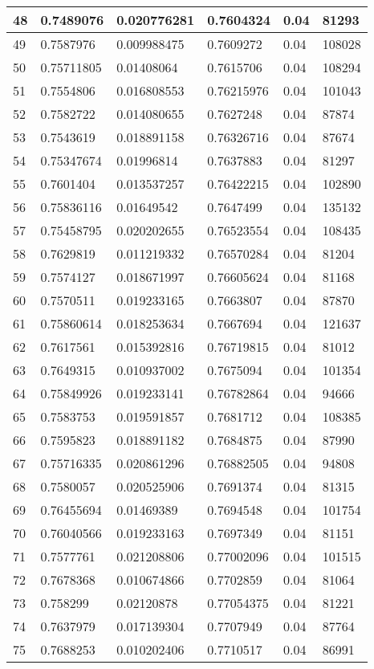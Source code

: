 \begin{longtable}{|l|l|l|l|l|l|}
48 & 0.7489076 & 0.020776281 & 0.7604324 & 0.04 & 81293 \\ \hline 
49 & 0.7587976 & 0.009988475 & 0.7609272 & 0.04 & 108028 \\ \hline 
50 & 0.75711805 & 0.01408064 & 0.7615706 & 0.04 & 108294 \\ \hline 
51 & 0.7554806 & 0.016808553 & 0.76215976 & 0.04 & 101043 \\ \hline 
52 & 0.7582722 & 0.014080655 & 0.7627248 & 0.04 & 87874 \\ \hline 
53 & 0.7543619 & 0.018891158 & 0.76326716 & 0.04 & 87674 \\ \hline 
54 & 0.75347674 & 0.01996814 & 0.7637883 & 0.04 & 81297 \\ \hline 
55 & 0.7601404 & 0.013537257 & 0.76422215 & 0.04 & 102890 \\ \hline 
56 & 0.75836116 & 0.01649542 & 0.7647499 & 0.04 & 135132 \\ \hline 
57 & 0.75458795 & 0.020202655 & 0.76523554 & 0.04 & 108435 \\ \hline 
58 & 0.7629819 & 0.011219332 & 0.76570284 & 0.04 & 81204 \\ \hline 
59 & 0.7574127 & 0.018671997 & 0.76605624 & 0.04 & 81168 \\ \hline 
60 & 0.7570511 & 0.019233165 & 0.7663807 & 0.04 & 87870 \\ \hline 
61 & 0.75860614 & 0.018253634 & 0.7667694 & 0.04 & 121637 \\ \hline 
62 & 0.7617561 & 0.015392816 & 0.76719815 & 0.04 & 81012 \\ \hline 
63 & 0.7649315 & 0.010937002 & 0.7675094 & 0.04 & 101354 \\ \hline 
64 & 0.75849926 & 0.019233141 & 0.76782864 & 0.04 & 94666 \\ \hline 
65 & 0.7583753 & 0.019591857 & 0.7681712 & 0.04 & 108385 \\ \hline 
66 & 0.7595823 & 0.018891182 & 0.7684875 & 0.04 & 87990 \\ \hline 
67 & 0.75716335 & 0.020861296 & 0.76882505 & 0.04 & 94808 \\ \hline 
68 & 0.7580057 & 0.020525906 & 0.7691374 & 0.04 & 81315 \\ \hline 
69 & 0.76455694 & 0.01469389 & 0.7694548 & 0.04 & 101754 \\ \hline 
70 & 0.76040566 & 0.019233163 & 0.7697349 & 0.04 & 81151 \\ \hline 
71 & 0.7577761 & 0.021208806 & 0.77002096 & 0.04 & 101515 \\ \hline 
72 & 0.7678368 & 0.010674866 & 0.7702859 & 0.04 & 81064 \\ \hline 
73 & 0.758299 & 0.02120878 & 0.77054375 & 0.04 & 81221 \\ \hline 
74 & 0.7637979 & 0.017139304 & 0.7707949 & 0.04 & 87764 \\ \hline 
75 & 0.7688253 & 0.010202406 & 0.7710517 & 0.04 & 86991 \\ \hline 
\end{longtable}